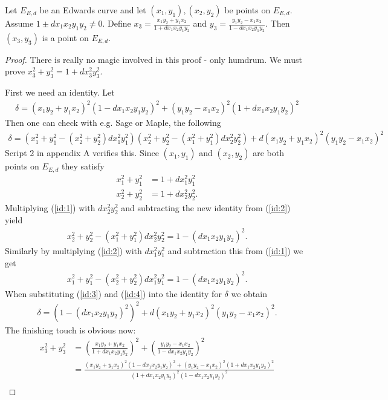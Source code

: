 \begin{thm}\label{thm:mapsToEd}
Let $E_{E,d}$ be an Edwards curve and let $(x_1,y_1),(x_2,y_2)$ be points on $E_{E,d}$. Assume $1\pm dx_1x_2y_1y_2\neq 0$. Define $x_3=\frac{x_1y_2+y_1x_2}{1+dx_1x_2y_1y_2}$ and $y_3=\frac{y_1y_2-x_1x_2}{1-dx_1x_2y_1y_2}$. Then $(x_3,y_3)$ is a point on $E_{E,d}$. 
\end{thm}
\begin{proof}
There is really no magic involved in this proof - only humdrum. We must prove $x_3^2+y_3^2=1+dx_3^2y_3^2$. 

First we need an identity. Let
\begin{align*}
	\delta = (x_1y_2+y_1x_2)^2(1-dx_1x_2y_1y_2)^2+(y_1y_2-x_1x_2)^2(1+dx_1x_2y_1y_2)^2
\end{align*} 
Then one can check with e.g. Sage or Maple, the following
\begin{align*}
	\delta = (x_1^2+y_1^2-(x_2^2+y_2^2)dx_1^2y_1^2)(x_2^2+y_2^2-(x_1^2+y_1^2)dx_2^2y_2^2)+d(x_1y_2+y_1x_2)^2(y_1y_2-x_1x_2)^2
\end{align*}
Script 2 in appendix A verifies this. Since $(x_1,y_1)$ and $(x_2,y_2)$ are both points on $E_{E,d}$ they satisfy
\begin{align}
 x_1^2+y_1^2&=1+dx_1^2y_1^2\label{id:1} \\
 x_2^2+y_2^2&=1+dx_2^2y_2^2\label{id:2}.
\end{align}
Multiplying (\ref{id:1}) with $dx_2^2y_2^2$ and subtracting the new identity from (\ref{id:2}) yield
\begin{align}\label{id:3}
	x_2^2+y_2^2-(x_1^2+y_1^2)dx_2^2y_2^2 = 1-(dx_1x_2y_1y_2)^2.
\end{align}
Similarly by multiplying (\ref{id:2}) with $dx_1^2y_1^2$ and subtraction this from (\ref{id:1}) we get
\begin{align}\label{id:4}
	x_1^2+y_1^2-(x_2^2+y_2^2)dx_1^2y_1^2 = 1-(dx_1x_2y_1y_2)^2.
\end{align}
When substituting (\ref{id:3}) and (\ref{id:4}) into the identity for $\delta$ we obtain
\begin{align*}
\delta = (1-(dx_1x_2y_1y_2)^2)^2+d(x_1y_2+y_1x_2)^2(y_1y_2-x_1x_2)^2.
\end{align*}
The finishing touch is obvious now:
\begin{align*}
	x_3^2+y_3^2 &=  \left(\frac{x_1y_2+y_1x_2}{1+dx_1x_2y_1y_2}\right)^2+\left(\frac{y_1y_2-x_1x_2}{1-dx_1x_2y_1y_2}\right)^2 \\
	&= \frac{(x_1y_2+y_1x_2)^2(1-dx_1x_2y_1y_2)^2+(y_1y_2-x_1x_2)^2(1+dx_1x_2y_1y_2)^2}{(1+dx_1x_2y_1y_2)^2(1-dx_1x_2y_1y_2)^2} \\

\end{align*}
\end{proof}

